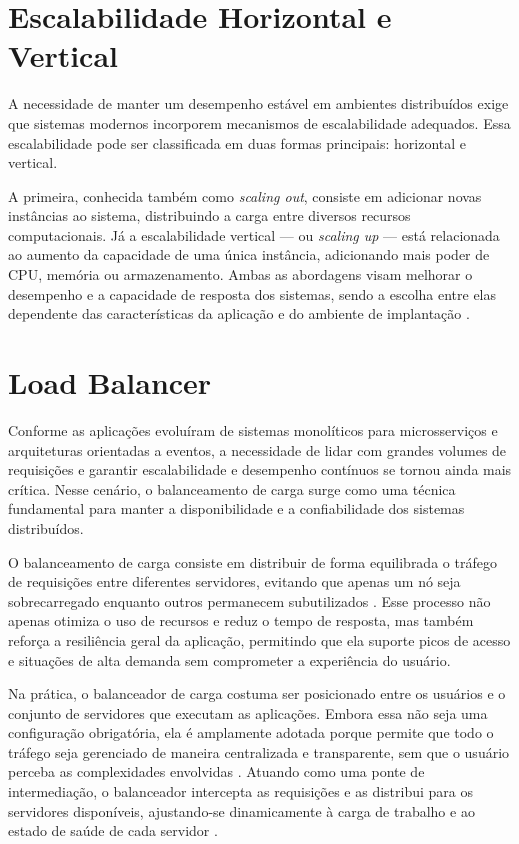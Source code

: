 \section{Escalabilidade Horizontal e Vertical}
A necessidade de manter um desempenho estável em ambientes distribuídos exige que sistemas modernos incorporem mecanismos de escalabilidade adequados. Essa escalabilidade pode ser classificada em duas formas principais: horizontal e vertical. 

A primeira, conhecida também como \textit{scaling out}, consiste em adicionar novas instâncias ao sistema, distribuindo a carga entre diversos recursos computacionais. Já a escalabilidade vertical — ou \textit{scaling up} — está relacionada ao aumento da capacidade de uma única instância, adicionando mais poder de CPU, memória ou armazenamento. Ambas as abordagens visam melhorar o desempenho e a capacidade de resposta dos sistemas, sendo a escolha entre elas dependente das características da aplicação e do ambiente de implantação \citep{9717259}.

\section{Load Balancer}

Conforme as aplicações evoluíram de sistemas monolíticos para microsserviços e arquiteturas orientadas a eventos, a necessidade de lidar com grandes volumes de requisições e garantir escalabilidade e desempenho contínuos se tornou ainda mais crítica. Nesse cenário, o balanceamento de carga surge como uma técnica fundamental para manter a disponibilidade e a confiabilidade dos sistemas distribuídos.

O balanceamento de carga consiste em distribuir de forma equilibrada o tráfego de requisições entre diferentes servidores, evitando que apenas um nó seja sobrecarregado enquanto outros permanecem subutilizados \citep{mohapatra2013}. Esse processo não apenas otimiza o uso de recursos e reduz o tempo de resposta, mas também reforça a resiliência geral da aplicação, permitindo que ela suporte picos de acesso e situações de alta demanda sem comprometer a experiência do usuário.

Na prática, o balanceador de carga costuma ser posicionado entre os usuários e o conjunto de servidores que executam as aplicações. Embora essa não seja uma configuração obrigatória, ela é amplamente adotada porque permite que todo o tráfego seja gerenciado de maneira centralizada e transparente, sem que o usuário perceba as complexidades envolvidas \citep{kumar2016}. Atuando como uma ponte de intermediação, o balanceador intercepta as requisições e as distribui para os servidores disponíveis, ajustando-se dinamicamente à carga de trabalho e ao estado de saúde de cada servidor \citep{bourke2001}.

